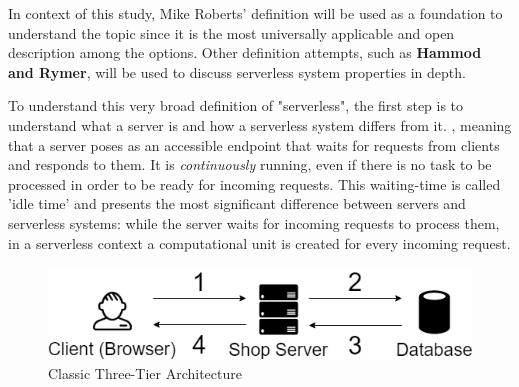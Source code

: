 In context of this study, Mike Roberts' definition will be used as a foundation to understand the topic since it is the most universally applicable and open description among the options. Other definition attempts, such as \textbf{Hammod and Rymer}, will be used to discuss serverless system properties in depth.

To understand this very broad definition of "serverless", the first step is to understand what a server is and how a serverless system differs from it. \autocite{Mitchell.Bradley2018TheServer}, meaning that a server poses as an accessible endpoint that waits for requests from clients and responds to them. It is \textit{continuously} running, even if there is no task to be processed in order to be ready for incoming requests. This waiting-time is called 'idle time' and presents the most significant difference between servers and serverless systems: while the server waits for incoming requests to process them, in a serverless context a computational unit is created for every incoming request.

\begin{figure}[ht]
    \includegraphics[width=0.9\linewidth]{images/drawio/3tier-oneclient.png}\centering
    \caption {Classic Three-Tier Architecture}
    \label{fig:3tier1client}
\end{figure}

